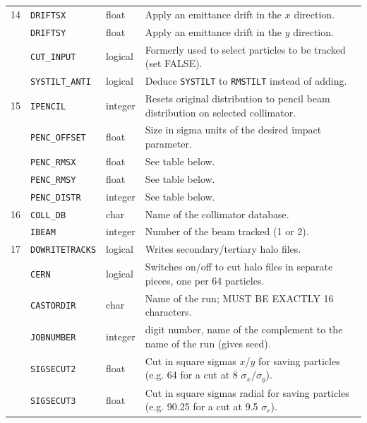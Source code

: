 \begin{center}
\begin{longtable}{| p{0.5cm} | p{2.4cm} | p{1.2cm} | >{\raggedright\arraybackslash}p{11.4cm}|}
    14  & \texttt{DRIFTSX}       & float   & Apply an emittance drift\index{emittance drift} in the $x$ direction. \\
        \cline{2-4}
        & \texttt{DRIFTSY}       & float   & Apply an emittance drift\index{emittance drift} in the $y$ direction. \\
        \cline{2-4}
        & \texttt{CUT\_INPUT}    & logical & Formerly used to select particles to be tracked (set FALSE). \\
        \cline{2-4}
        & \texttt{SYSTILT\_ANTI} & logical & Deduce \texttt{SYSTILT} to \texttt{RMSTILT} instead of adding. \\
    \hline

    15  & \texttt{IPENCIL}       & integer & Resets original distribution to pencil beam\index{pencil beam} distribution on selected collimator. \\
        \cline{2-4}
        & \texttt{PENC\_OFFSET}  & float   & Size in sigma units of the desired impact parameter. \\
        \cline{2-4}
        & \texttt{PENC\_RMSX}    & float   & See table below. \\
        \cline{2-4}
        & \texttt{PENC\_RMSY}    & float   & See table below. \\
        \cline{2-4}
        & \texttt{PENC\_DISTR}   & integer & See table below. \\
    \hline

    16  & \texttt{COLL\_DB}      & char    & Name of the collimator database. \\
        \cline{2-4}
        & \texttt{IBEAM}         & integer & Number of the beam tracked (1 or 2). \\
    \hline

    17  & \texttt{DOWRITETRACKS} & logical & Writes secondary/tertiary halo files. \\
        \cline{2-4}
        & \texttt{CERN}          & logical & Switches on/off to cut halo files in separate pieces, one per 64 particles. \\
        \cline{2-4}
        & \texttt{CASTORDIR}     & char    & Name of the run; MUST BE EXACTLY 16 characters. \\
        \cline{2-4}
        & \texttt{JOBNUMBER}     & integer & 5 digit number, name of the complement to the name of the run (gives seed). \\
        \cline{2-4}
        & \texttt{SIGSECUT2}     & float   & Cut in square sigmas $x$/$y$ for saving particles (e.g. 64 for a cut at 8 $\sigma_x$/$\sigma_y$). \\
        \cline{2-4}
        & \texttt{SIGSECUT3}     & float   & Cut in square sigmas radial for saving particles (e.g. 90.25 for a cut at 9.5 $\sigma_r$). \\
    \hline
\end{longtable}
\end{center}

